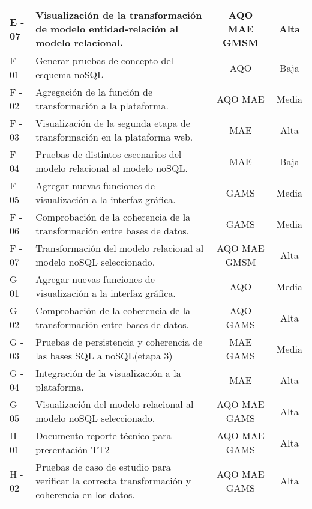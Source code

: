 \begin{longtable}{ p{1.3cm} | p{7.6cm} | c | c }
	\hline
	\centering E - 07 & Visualización de la transformación de modelo entidad-relación al modelo relacional. & AQO MAE GMSM& Alta \\[.5cm]
	\hline
	\centering F - 01 & Generar pruebas de concepto del esquema noSQL & AQO & Baja \\[.5cm]
	\hline
	\centering F - 02 & Agregación de la función de transformación a la plataforma. & AQO MAE & Media \\[.5cm]
	\hline
	\centering F - 03 & Visualización de la segunda etapa de transformación en la plataforma web. & MAE & Alta \\[.5cm]
	\hline
	\centering F - 04 & Pruebas de distintos escenarios del modelo relacional al modelo noSQL. & MAE & Baja \\[.5cm]
	\hline
	\centering F - 05 & Agregar nuevas funciones de visualización a la interfaz gráfica. & GAMS & Media \\[.5cm]
	\hline
	\centering F - 06 & Comprobación de la coherencia de la transformación entre bases de datos. & GAMS & Media \\[.5cm]
	\hline
	\centering F - 07 & Transformación del modelo relacional al modelo noSQL seleccionado. & AQO MAE GMSM& Alta \\[.5cm]
	\hline
	\centering G - 01 & Agregar nuevas funciones de visualización a la interfaz gráfica. & AQO & Media \\[.5cm]
	\hline
	\centering G - 02 & Comprobación de la coherencia de la transformación entre bases de datos. & AQO GAMS& Alta \\[.5cm]
	\hline
	\centering G - 03 & Pruebas de persistencia y coherencia de las bases SQL a noSQL(etapa 3) & MAE GAMS& Media \\[.5cm]
	\hline
	\centering G - 04 & Integración de la visualización a la plataforma. & MAE & Alta \\[.5cm]
	\hline
	\centering G - 05 & Visualización del modelo relacional al modelo noSQL seleccionado. & AQO MAE GAMS& Alta \\[.5cm]
	\hline
	\centering H - 01 & Documento reporte técnico para presentación TT2 & AQO MAE GAMS & Alta \\[.5cm]
	\hline
	\centering H - 02 & Pruebas de caso de estudio para verificar la correcta transformación y coherencia en los datos. & AQO MAE GAMS & Alta \\[.5cm]
	\hline
	
\end{longtable}






